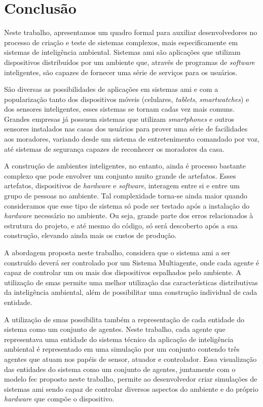 \chapter{Conclusão}
\label{chap:conclusao}

    Neste trabalho, apresentamos um quadro formal para auxiliar desenvolvedores no processo de criação e teste de sistemas complexos, mais especificamente em sistemas de inteligência ambiental. Sistemas \acrshort{ami} são aplicações que utilizam dispositivos distribuídos por um ambiente que, através de programas de \textit{software} inteligentes, são capazes de fornecer uma série de serviços para os usuários. 
    
    São diversas as possibilidades de aplicações em sistemas \acrshort{ami} e com a popularização tanto dos dispositivos móveis (celulares, \textit{tablets}, \textit{smartwatches}) e dos sensores inteligentes, esses sistemas se tornam cadas vez mais comuns. Grandes empresas já possuem sistemas que utilizam \textit{smartphones} e outros sensores instalados nas casas dos usuários para prover uma série de facilidades aos moradores, variando desde um sistema de entretenimento comandado por voz, até sistemas de segurança capazes de reconhecer os moradores da casa. 
    
    A construção de ambientes inteligentes, no entanto, ainda é processo bastante complexo que pode envolver um conjunto muito grande de artefatos. Esses artefatos, dispositivos de \textit{hardware} e \textit{software}, interagem entre si e entre um grupo de pessoas no ambiente. Tal complexidade torna-se ainda maior quando consideramos que esse tipo de sistema só pode ser testado após a instalação do \textit{hardware} necessário no ambiente. Ou seja, grande parte dos erros relacionados à estrutura do projeto, e até mesmo do código, só será descoberto após a sua construção, elevando ainda mais os custos de produção. 
    
    A abordagem proposta neste trabalho, considera que o sistema \acrshort{ami} a ser construído deverá ser controlado por um Sistema Multiagente, onde cada agente é capaz de controlar um ou mais dos dispositivos espalhados pelo ambiente. A utilização de \acrshort{sma}s permite uma melhor utilização das características distributivas da inteligência ambiental, além de possibilitar uma construção individual de cada entidade. 
    
    A utilização de \acrshort{sma}s possibilita  também a representação de cada entidade do sistema como um conjunto de agentes. Neste trabalho, cada agente que representava uma entidade do sistema técnico da aplicação de inteligência ambiental é representado em uma simulação por um conjunto contendo três agentes que atuam nos papéis de sensor, atuador e controlador. Essa visualização das entidades do sistema como um conjunto de agentes, juntamente com o modelo \acrshort{fec} proposto neste trabalho, permite ao desenvolvedor criar simulações de sistemas \acrshort{ami} sendo capaz de controlar diversos aspectos do ambiente e do próprio \textit{hardware} que compõe o dispositivo.
    
